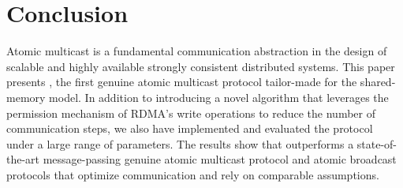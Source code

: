\section{Conclusion}
\label{sec:conclusion}

Atomic multicast is a fundamental communication abstraction in the design of scalable and highly available strongly consistent distributed systems.
This paper presents \libname, the first genuine atomic multicast protocol tailor-made for the shared-memory model.
In addition to introducing a novel algorithm that leverages the permission mechanism of RDMA's write operations to reduce the number of communication steps, we also have implemented and evaluated the protocol under a large range of parameters.
The results show that \libname outperforms a state-of-the-art message-passing genuine atomic multicast protocol and atomic broadcast protocols that optimize communication and rely on comparable assumptions.
